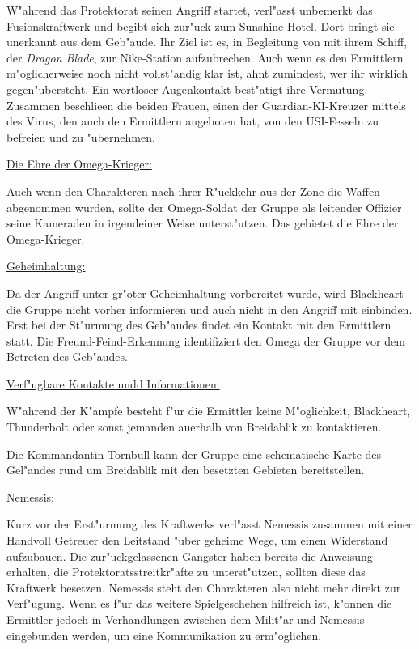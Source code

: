 W"ahrend das Protektorat seinen Angriff startet, verl"asst \xl{} unbemerkt das Fusionskraftwerk und begibt sich zur"uck zum Sunshine Hotel. Dort bringt sie \ml{} unerkannt aus dem Geb"aude. Ihr Ziel ist es, in Begleitung von \ml{} mit ihrem Schiff, der \emph{Dragon Blade}, zur Nike-Station aufzubrechen. Auch wenn es den Ermittlern m"oglicherweise noch nicht vollst"andig klar ist, ahnt \ml{} zumindest, wer ihr wirklich gegen"ubersteht. Ein wortloser Augenkontakt best"atigt ihre Vermutung. Zusammen beschlie\3en die beiden Frauen, einen der Guardian-KI-Kreuzer mittels des Virus, den \ml{} auch den Ermittlern angeboten hat, von den USI-Fesseln zu befreien und zu "ubernehmen.

\begin{remarks}
	\underline{Die Ehre der Omega-Krieger:}

	Auch wenn den Charakteren nach ihrer R"uckkehr aus der Zone die Waffen abgenommen wurden, sollte der Omega-Soldat der Gruppe als leitender Offizier seine Kameraden in irgendeiner Weise unterst"utzen. Das gebietet die Ehre der Omega-Krieger.
	
	\underline{Geheimhaltung:}

	Da der Angriff unter gr"o\3ter Geheimhaltung vorbereitet wurde, wird Blackheart die Gruppe nicht vorher informieren und auch nicht in den Angriff mit einbinden. Erst bei der St"urmung des Geb"audes findet ein Kontakt mit den Ermittlern statt. Die Freund-Feind-Erkennung identifiziert den Omega der Gruppe vor dem Betreten des Geb"audes.

	\underline{Verf"ugbare Kontakte undd Informationen:}
	
	W"ahrend der K"ampfe besteht f"ur die Ermittler keine M"oglichkeit, Blackheart, Thunderbolt oder sonst jemanden au\3erhalb von Breidablik zu kontaktieren. 
	
	Die Kommandantin Tornbull kann der Gruppe eine schematische Karte des Gel"andes rund um Breidablik mit den besetzten Gebieten bereitstellen.

	\underline{Nemessis:}

	Kurz vor der Erst"urmung des Kraftwerks verl"asst Nemessis zusammen mit einer Handvoll Getreuer den Leitstand "uber geheime Wege, um einen Widerstand aufzubauen. Die zur"uckgelassenen Gangster haben bereits die Anweisung erhalten, die Protektoratsstreitkr"afte zu unterst"utzen, sollten diese das Kraftwerk besetzen. Nemessis steht den Charakteren also nicht mehr direkt zur Verf"ugung. Wenn es f"ur das weitere Spielgeschehen hilfreich ist, k"onnen die Ermittler jedoch in Verhandlungen zwischen dem Milit"ar und Nemessis eingebunden werden, um eine Kommunikation zu erm"oglichen.
\end{remarks}
